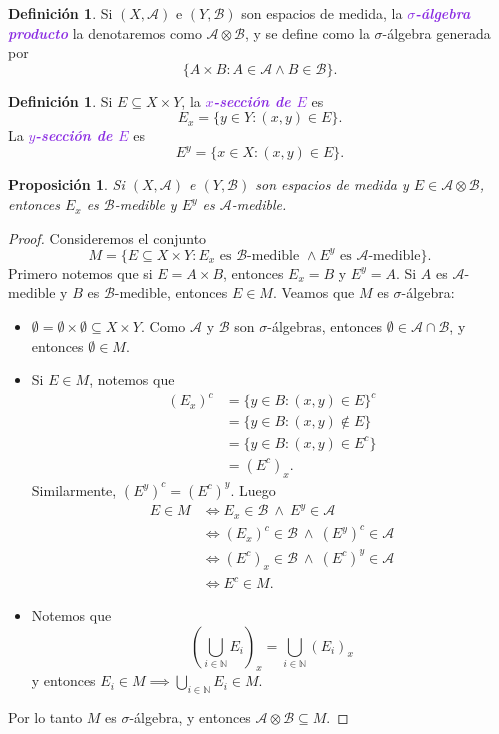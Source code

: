 \documentclass{article}
\newtheorem{proposition}[theorem]{Proposición}
\theoremstyle{definition}
\newtheorem{definition}[theorem]{Definición}
\theoremstyle{remark}
\numberwithin{equation}{section}
\newcommand{\N}{\mathbb{N}}
\newcommand{\Acal}{\mathcal{A}}
\newcommand{\Bcal}{\mathcal{B}}
\newcommand{\br}[1]{\left( #1 \right)}
\newcommand{\wea}[1]{\textcolor{BlueViolet}{\textbf{\emph{#1}}}}
\begin{document}
\begin{definition}
  Si $(X,\Acal)$ e $(Y,\Bcal)$ son espacios de medida, la \wea{\( \sigma \)-álgebra producto} la denotaremos como $\Acal \otimes \Bcal$, y se define como la \( \sigma \)-álgebra generada por
  \[ \{A \times B : A \in \Acal \land B \in \Bcal\}. \]
\end{definition}

\begin{definition}
  Si $E \subseteq X \times Y$, la \wea{$x$-sección de $E$} es
  \[ E_x = \{y \in Y : (x,y) \in E\}. \]
  La \wea{$y$-sección de $E$} es
  \[ E^y = \{x \in X : (x,y) \in E\}. \]
\end{definition}

\begin{proposition}
  Si $(X,\Acal)$ e $(Y,\Bcal)$ son espacios de medida y $E \in \Acal \otimes \Bcal$, entonces $E_x$ es $\Bcal$-medible y $E^y$ es $\Acal$-medible.
\end{proposition}
\begin{proof}
  Consideremos el conjunto
  \[ M = \{E \subseteq X \times Y : E_x \text{ es $\Bcal$-medible } \land E^y \text{ es $\Acal$-medible}\}. \]
  Primero notemos que si $E = A \times B$, entonces $E_x = B$ y $E^y = A$. Si $A$ es $\Acal$-medible y $B$ es $\Bcal$-medible, entonces $E \in M$.
  Veamos que $M$ es \( \sigma \)-álgebra:
  \begin{itemize}
    \item $\emptyset = \emptyset \times \emptyset \subseteq X \times Y$. Como $\Acal$ y $\Bcal$ son \( \sigma \)-álgebras, entonces $\emptyset \in \Acal \cap \Bcal$, y entonces $\emptyset \in M$.
    \item Si $E \in M$, notemos que
    \begin{align*}
      (E_x)^c &= \{y \in B : (x,y) \in E\}^c \\
      &= \{y \in B : (x,y) \notin E\} \\
      &= \{y \in B : (x,y) \in E^c\} \\
      &= (E^c)_x.
    \end{align*}
    Similarmente, $(E^y)^c = (E^c)^y$. Luego
    \begin{align*}
        E \in M &\iff E_x \in \Bcal \ \land \ E^y \in \Acal \\
        &\iff (E_x)^c \in \Bcal \ \land \ (E^y)^c \in \Acal \\
        &\iff (E^c)_x \in \Bcal \ \land \ (E^c)^y \in \Acal \\
        &\iff E^c \in M.
    \end{align*}
    \item Notemos que
    \[ \br{\bigcup_{i\in\N} E_i}_x = \bigcup_{i\in\N} (E_i)_x \]
    y entonces $E_i \in M \implies \bigcup_{i\in\N} E_i \in M$.
  \end{itemize}
  Por lo tanto $M$ es \( \sigma \)-álgebra, y entonces $\Acal \otimes \Bcal \subseteq M$.
\end{proof}
\end{document}
